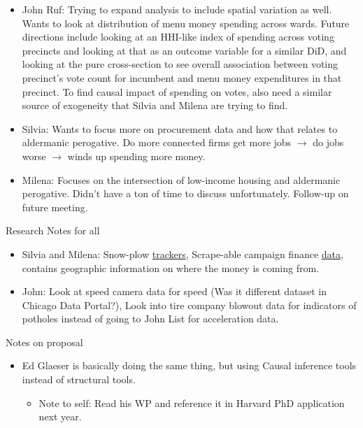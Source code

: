 \documentclass[10pt,a4paper,twoside]{mins}
\begin{document}
\begin{minutes}
\begin{business}
\begin{itemize}
    \item John Ruf: Trying to expand analysis to include spatial variation as well. Wants to look at distribution of menu money spending across wards. Future directions include looking at an HHI-like index of spending across voting precincts and looking at that as an outcome variable for a similar DiD, and looking at the pure cross-section to see overall association between voting precinct's vote count for incumbent and menu money expenditures in that precinct. To find causal impact of spending on votes, also need a similar source of exogeneity that Silvia and Milena are trying to find. 
    \item Silvia: Wants to focus more on procurement data and how that relates to aldermanic perogative. Do more connected firms get more jobs $\rightarrow$ do jobs worse $\rightarrow$ winds up spending more money.
    \item Milena: Focuses on the intersection of low-income housing and aldermanic perogative. Didn't have a ton of time to discuss unfortunately. Follow-up on future meeting. 
\end{itemize}
Research Notes for all
\begin{itemize}
    \item Silvia and Milena: Snow-plow \href{https://plow-tracker-chicago.hub.arcgis.com/search?collection=Dataset}{trackers}, Scrape-able campaign finance \href{https://www.elections.il.gov/campaigndisclosure/candidatesearch.aspx}{data}, contains geographic information on where the money is coming from.
    \item John: Look at speed camera data for speed (Was it different dataset in Chicago Data Portal?), Look into tire company blowout data for indicators of potholes instead of going to John List for acceleration data. 
\end{itemize}


\item Notes on proposal 
\begin{itemize}
    \item Ed Glaeser is basically doing the same thing, but using Causal inference tools instead of structural tools.
    \begin{itemize}
        \item Note to self: Read his WP and reference it in Harvard PhD application next year. 
    \end{itemize}


\end{itemize}
\end{business}
\end{minutes}
\end{document}
